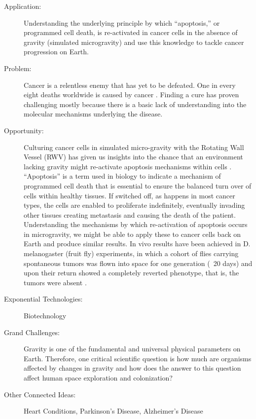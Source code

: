\begin{description}  \item[Application:] Understanding the underlying principle by which ``apoptosis,'' or programmed cell death, is re-activated in cancer cells  in the absence of gravity (simulated microgravity) and use this  knowledge to tackle cancer progression on Earth. 
 
\item[Problem:] Cancer is a  relentless enemy that has yet to be defeated. One in every eight deaths  worldwide is caused by cancer \cite{AmericanCancerSociety2010}. Finding a  cure has proven challenging mostly because there is a basic lack of  understanding into the molecular mechanisms underlying the disease.
 
\item[Opportunity:] Culturing  cancer cells in simulated micro-gravity with the Rotating Wall Vessel  (RWV) has given us insights into the chance that an environment lacking  gravity might re-activate apoptosis mechanisms within cells \cite{Grimm}. ``Apoptosis'' is a term used in biology to indicate a mechanism  of programmed cell death that is essential to ensure the balanced turn  over of cells within healthy tissues. If switched off, as happens in  most cancer types, the cells are enabled to proliferate indefinitely,  eventually invading other tissues creating metastasis and causing the  death of the patient. Understanding the mechanisms by which  re-activation of apoptosis occurs in microgravity, we might be able to  apply these to cancer cells back on Earth and produce similar results.  In vivo results have been achieved in D. melanogaster (fruit fly)  experiments, in which a cohort of flies carrying spontaneous tumors was  flown into space for one generation (~20 days) and upon their return  showed a completely reverted phenotype, that is, the tumors were absent \cite{Fahlen2006}. 
 
\item[Exponential Technologies:]  Biotechnology

\item[Grand Challenges:] Gravity is one of the fundamental and universal physical parameters on Earth.  Therefore, one critical scientific question is how much are organisms  affected by changes in gravity and how does the answer to this question  affect human space exploration and colonization?  
 
\item[Other Connected Ideas:]  Heart Conditions, Parkinson's Disease, Alzheimer's Disease
 

\end{description}
